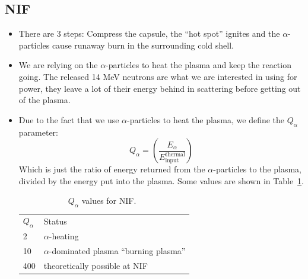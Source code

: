 \documentclass[letter]{article}
\begin{document}
\subsection{NIF}
\begin{itemize}
\item There are 3 steps: Compress the capsule, the ``hot spot''
  ignites and the $\alpha$-particles cause runaway burn in the
  surrounding cold shell.~\cite[Lec. 29]{lecture}
\item We are relying on the $\alpha$-particles to heat the plasma and
  keep the reaction going. The released 14 MeV neutrons are what we
  are interested in using for power, they leave a lot of their energy
  behind in scattering before getting out of the
  plasma.~\cite[Lec. 29]{lecture}
\item Due to the fact that we use $\alpha$-particles to heat the
  plasma, we define the $Q_\alpha$ parameter:
  \begin{equation*}
    Q_\alpha = \left(\frac{E_\alpha}{E^{\text{thermal}}_{\text{input}}}\right)
  \end{equation*}
Which is just the ratio of energy returned from the $\alpha$-particles
to the plasma, divided by the energy put into the plasma. Some values
are shown in Table~\ref{tab:q-alpha}.
\begin{table}[hbtp]
\centering
\begin{tabular}{ll}
$Q_\alpha$ &  Status\\
2 & $\alpha$-heating \\
10 & $\alpha$-dominated plasma ``burning plasma'' \\
400 & theoretically possible at NIF
\end{tabular}
\caption{$Q_\alpha$ values for NIF.~\cite[Lec. 29]{lecture}}
\label{tab:q-alpha}
\end{table}
\end{itemize}
\end{document}
